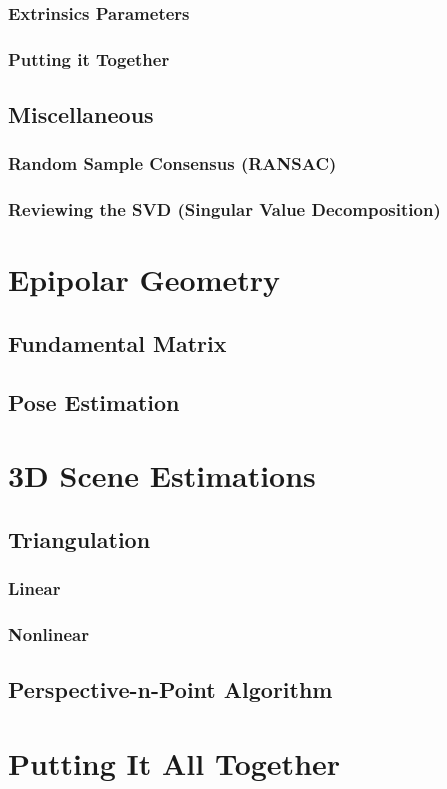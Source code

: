 \documentclass{book}
\begin{document}
            \subsection{Extrinsics Parameters}

            \subsection{Putting it Together}

        \section{Miscellaneous}
            \subsection{Random Sample Consensus (RANSAC)}
        
            \subsection{Reviewing the SVD (Singular Value Decomposition)}

    \chapter{Epipolar Geometry} 
        \section{Fundamental Matrix}

        \section{Pose Estimation}

    \chapter{3D Scene Estimations}
        \section{Triangulation}
            \subsection{Linear}

            \subsection{Nonlinear}

        \section{Perspective-n-Point Algorithm}

    \chapter{Putting It All Together}
\end{document}
